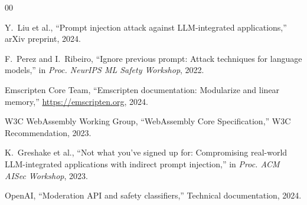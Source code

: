 \documentclass[conference]{IEEEtran}
\begin{document}
\begin{thebibliography}{00}

Y.~Liu et al., ``Prompt injection attack against LLM-integrated applications,'' arXiv preprint, 2024.

F.~Perez and I.~Ribeiro, ``Ignore previous prompt: Attack techniques for language models,'' in \emph{Proc. NeurIPS ML Safety Workshop}, 2022.

Emscripten Core Team, ``Emscripten documentation: Modularize and linear memory,'' \url{https://emscripten.org}, 2024.

W3C WebAssembly Working Group, ``WebAssembly Core Specification,'' W3C Recommendation, 2023.

K.~Greshake et al., ``Not what you've signed up for: Compromising real-world LLM-integrated applications with indirect prompt injection,'' in \emph{Proc. ACM AISec Workshop}, 2023.

OpenAI, ``Moderation API and safety classifiers,'' Technical documentation, 2024.

\end{thebibliography}

\balance
\end{document}
